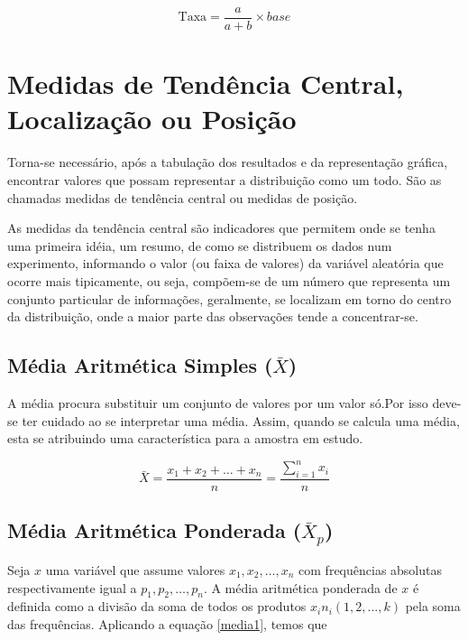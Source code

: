 $$ \mbox{Taxa} = \frac{a}{a+b} \times base$$



\section{Medidas de Tendência Central, Localização ou Posição}

Torna-se necessário, após a tabulação dos resultados e da representação gráfica, encontrar valores que possam representar a distribuição como um todo. São as chamadas medidas de tendência central ou medidas de posição.\vskip0.3cm

As medidas da tendência central são indicadores que permitem onde se tenha uma primeira idéia, um resumo, de como se distribuem os dados num experimento, informando o valor (ou faixa de valores) da variável aleatória que ocorre mais tipicamente, ou seja, compõem-se de um número que representa um conjunto particular de informações, geralmente, se localizam em torno do centro da distribuição, onde a maior parte das observações tende a concentrar-se.





\subsection{Média Aritmética Simples ($\bar{X}$)}

A média procura substituir um conjunto de valores por um valor só.Por isso
deve-se ter cuidado ao se interpretar uma média. Assim, quando se calcula uma média, esta se atribuindo
uma característica para a amostra em estudo.



\begin{equation}\label{media1}
     \bar{X}=\frac{x_{1}+x_{2}+\ldots+x_{n}}{n}=\frac{\sum_{i=1}^{n}x_{i}}{n}
\end{equation}



\newpage
\subsection{Média Aritmética Ponderada ($\bar{X}_{p}$)}

Seja $x$ uma variável que assume valores $x_{1},x_{2},\ldots,x_{n}$ com frequências absolutas respectivamente igual a $p_{1},p_{2},\ldots,p_{n}$. A média aritmética ponderada de $x$ é  definida como a divisão da soma de todos os produtos $x_{i} n_{i}(1,2,...,k)$ pela soma das frequências. Aplicando a equação \ref{media1}, temos que


